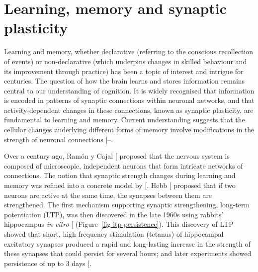 \documentclass[
  11pt,
  letterpaper,
]{scrreprt}
\begin{document}
\section{Learning, memory and synaptic
plasticity}\label{sec-learning-memory-plasticity}

Learning and memory, whether declarative (referring to the conscious
recollection of events) or non-declarative (which underpins changes in
skilled behaviour and its improvement through practice) has been a topic
of interest and intrigue for centuries. The question of how the brain
learns and stores information remains central to our understanding of
cognition. It is widely recognised that information is encoded in
patterns of synaptic connections within neuronal networks, and that
activity-dependent changes in these connections, known as synaptic
plasticity, are fundamental to learning and memory. Current
understanding suggests that the cellular changes underlying different
forms of memory involve modifications in the strength of neuronal
connections
{[}--\citeproc{ref-abraham2019Plasticity}{19}{]}.

Over a century ago, Ramón y Cajal
{[}\citeproc{ref-ramonycajal1909HistologieSystemeNerveux}{20}{]}
proposed that the nervous system is composed of microscopic, independent
neurons that form intricate networks of connections. The notion that
synaptic strength changes during learning and memory was refined into a
concrete model by
{[}\citeproc{ref-hebb1949OrganizationBehaviorNeuropsychological}{21}{]}.
Hebb
{[}\citeproc{ref-hebb1949OrganizationBehaviorNeuropsychological}{21}{]}
proposed that if two neurons are active at the same time, the synapses
between them are strengthened. The first mechanism supporting synaptic
strengthening, long-term potentiation (LTP), was then discovered in the
late 1960s using rabbits' hippocampus \emph{in vitro}
{[}\citeproc{ref-lomo1971PatternsActivationMonosynaptic}{22}{]}
(Figure~\ref{fig-ltp-persistence}). This discovery of LTP showed that
short, high frequency stimulation (tetanus) of hippocampal excitatory
synapses produced a rapid and long-lasting increase in the strength of
these synapses that could persist for several hours; and later
experiments showed persistence of up to 3 days
{[}\citeproc{ref-bliss1973Longlasting}{23}{]}.
\end{document}
